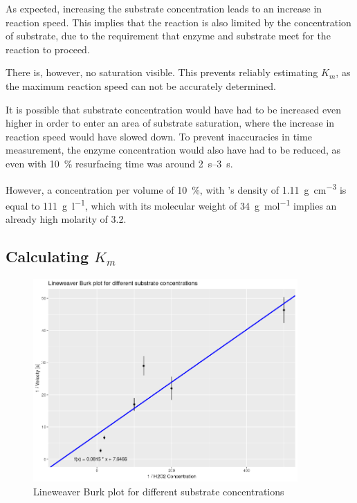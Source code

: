 \documentclass[a4paper,english]{scrreprt}
\begin{document}
As expected, increasing the substrate concentration leads to an increase in
reaction speed. This implies that the reaction is also limited by the
concentration of substrate, due to the requirement that enzyme and substrate
meet for the reaction to proceed.

There is, however, no saturation visible. This prevents reliably estimating
$K_m$, as the maximum reaction speed can not be accurately determined.

It is possible that substrate concentration would have had to be increased even
higher in order to enter an area of substrate saturation, where the increase in
reaction speed would have slowed down. To prevent inaccuracies in time
measurement, the enzyme concentration would also have had to be reduced, as
even with \SI{10}{\percent}  resurfacing time was around
\SIrange{2}{3}{\s}.

However, a concentration per volume of \SI{10}{\percent}, with 's
density of \SI{1.11}{\g \per \cm^3} is equal to \SI{111}{\g \per \l}, which
with its molecular weight of \SI{34}{\g \per \mol} implies an already high
molarity of \SI{3.2}{\Molar}.

\subsection{Calculating $K_m$}

\begin{figure}
	\centering
	\includegraphics[width=0.9\textwidth]{img/substrate_concentration_lburk.png}
	\caption{Lineweaver Burk plot for different substrate concentrations}
	\label{fig:substrate_concentration_lburk}
\end{figure}
\end{document}
